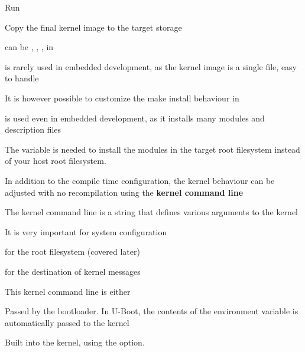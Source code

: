   \startitemize
  \item Run 
  \item Copy the final kernel image to the target storage
    \startitemize
    \item can be , , ,
       in 
    \stopitemize
  \item {} is rarely used in embedded development, as the
    kernel image is a single file, easy to handle
    \startitemize
    \item It is however possible to customize the make install
      behaviour in 
    \stopitemize
  \item {} is used even in embedded
    development, as it installs many modules and description files
    \startitemize
    \item {}
    \item The  variable is needed to install
      the modules in the target root filesystem instead of your host
      root filesystem.
    \stopitemize
  \stopitemize

  \startitemize
  \item In addition to the compile time configuration, the kernel
    behaviour can be adjusted with no recompilation using the {\bf
      kernel command line}
  \item The kernel command line is a string that defines various
    arguments to the kernel
    \startitemize
    \item It is very important for system configuration
    \item {} for the root filesystem (covered later)
    \item {} for the destination of kernel messages
    \stopitemize
  \item This kernel command line is either
    \startitemize
    \item Passed by the bootloader. In U-Boot, the contents of the
       environment variable is automatically passed to the
      kernel
    \item Built into the kernel, using the  option.
    \stopitemize
  \stopitemize
